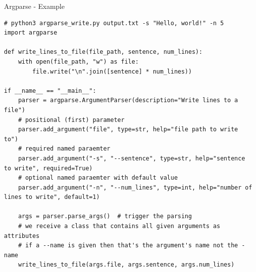 \documentclass[12pt, aspectratio=169, usepdftitle=false]{beamer}
\begin{document}
\begin{frame}[fragile]{Argparse - Example}
	\begin{lstlisting}[language=pytiny]
# python3 argparse_write.py output.txt -s "Hello, world!" -n 5
import argparse

def write_lines_to_file(file_path, sentence, num_lines):
    with open(file_path, "w") as file:
        file.write("\n".join([sentence] * num_lines))

if __name__ == "__main__":
    parser = argparse.ArgumentParser(description="Write lines to a file")
    # positional (first) parameter
    parser.add_argument("file", type=str, help="file path to write to")
    # required named paraemter
    parser.add_argument("-s", "--sentence", type=str, help="sentence to write", required=True)
    # optional named paraemter with default value
    parser.add_argument("-n", "--num_lines", type=int, help="number of lines to write", default=1)

    args = parser.parse_args()  # trigger the parsing
    # we receive a class that contains all given arguments as attributes
    # if a --name is given then that's the argument's name not the -name
    write_lines_to_file(args.file, args.sentence, args.num_lines)
	\end{lstlisting}
\end{frame}

{}
\end{document}

